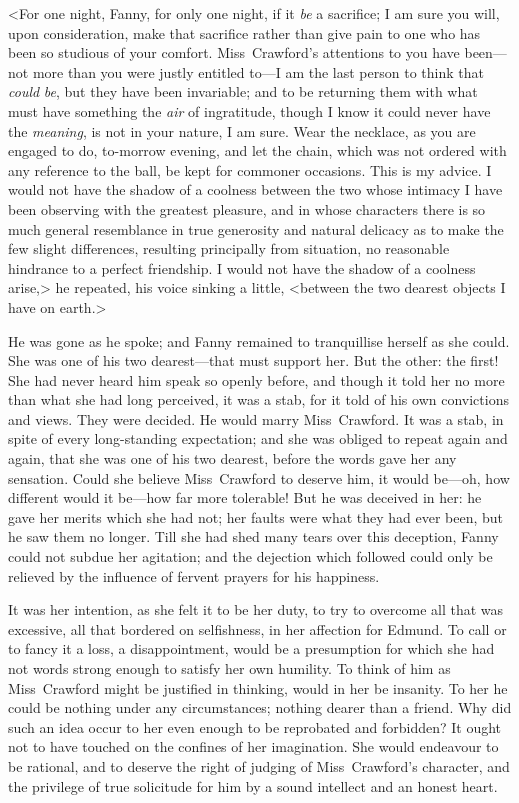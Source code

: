 <For one night, Fanny, for only one night, if it \textit{be}  a sacrifice; I am sure you will, upon consideration, make that sacrifice rather than give pain to one who has been so studious of your comfort. Miss~Crawford's attentions to you have been—not more than you were justly entitled to—I am the last person to think that \textit{could}  \textit{be}, but they have been invariable; and to be returning them with what must have something the \textit{air}  of ingratitude, though I know it could never have the \textit{meaning}, is not in your nature, I am sure. Wear the necklace, as you are engaged to do, to-morrow evening, and let the chain, which was not ordered with any reference to the ball, be kept for commoner occasions. This is my advice. I would not have the shadow of a coolness between the two whose intimacy I have been observing with the greatest pleasure, and in whose characters there is so much general resemblance in true generosity and natural delicacy as to make the few slight differences, resulting principally from situation, no reasonable hindrance to a perfect friendship. I would not have the shadow of a coolness arise,> he repeated, his voice sinking a little, <between the two dearest objects I have on earth.>

He was gone as he spoke; and Fanny remained to tranquillise herself as she could. She was one of his two dearest—that must support her. But the other: the first! She had never heard him speak so openly before, and though it told her no more than what she had long perceived, it was a stab, for it told of his own convictions and views. They were decided. He would marry Miss~Crawford. It was a stab, in spite of every long-standing expectation; and she was obliged to repeat again and again, that she was one of his two dearest, before the words gave her any sensation. Could she believe Miss~Crawford to deserve him, it would be—oh, how different would it be—how far more tolerable! But he was deceived in her: he gave her merits which she had not; her faults were what they had ever been, but he saw them no longer. Till she had shed many tears over this deception, Fanny could not subdue her agitation; and the dejection which followed could only be relieved by the influence of fervent prayers for his happiness.

It was her intention, as she felt it to be her duty, to try to overcome all that was excessive, all that bordered on selfishness, in her affection for Edmund. To call or to fancy it a loss, a disappointment, would be a presumption for which she had not words strong enough to satisfy her own humility. To think of him as Miss~Crawford might be justified in thinking, would in her be insanity. To her he could be nothing under any circumstances; nothing dearer than a friend. Why did such an idea occur to her even enough to be reprobated and forbidden? It ought not to have touched on the confines of her imagination. She would endeavour to be rational, and to deserve the right of judging of Miss~Crawford's character, and the privilege of true solicitude for him by a sound intellect and an honest heart.

